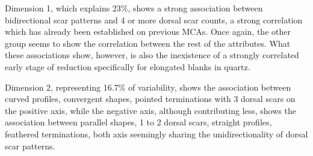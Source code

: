 \documentclass[12pt,twoside]{reedthesis}
\begin{document}
Dimension 1, which explains 23\%, shows a strong association between bidirectional scar patterns and 4 or more dorsal scar counts, a strong correlation which has already been established on previous MCAs. Once again, the other group seems to show the correlation between the rest of the attributes. What these associations show, however, is also the inexistence of a strongly correlated early stage of reduction specifically for elongated blanks in quartz.

Dimension 2, representing 16.7\% of variability, shows the association between curved profiles, convergent shapes, pointed terminations with 3 dorsal scars on the positive axis, while the negative axis, although contributing less, shows the association between parallel shapes, 1 to 2 dorsal scars, straight profiles, feathered terminations, both axis seemingly sharing the unidirectionality of dorsal scar patterns.
\end{document}
